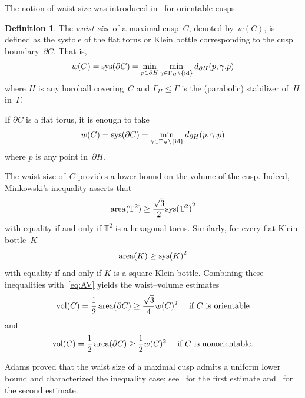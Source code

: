\documentclass[11pt,reqno]{amsart}
\theoremstyle{definition}
\newtheorem{definition}[theorem]{Definition}
\numberwithin{equation}{section}
\newcommand\T {{\mathbb T}}
\DeclareMathOperator{\area}{{\rm area}}
\DeclareMathOperator{\vol}{{\rm vol}}
\DeclareMathOperator{\sys}{{\rm sys}}
\DeclareMathOperator{\id}{id}
\numberwithin{equation}{section}
\begin{document}
\medskip

The notion of waist size was introduced in~\cite{adams_waist} for orientable cusps.

\begin{definition} \label{def:waist}
The \emph{waist size} of a maximal cusp~$C$, denoted by~$w(C)$, is defined as the systole of the flat torus or Klein bottle corresponding to the cusp boundary~$\partial C$.
That is,
\[
w(C) = \sys(\partial C) =  \min_{p \in \partial H} \min_{\gamma \in \Gamma_H \setminus \{ \id \}} d_{\partial H}(p,\gamma.p)
\]
where $H$ is any horoball covering~$C$ and $\Gamma_H \leqslant \Gamma$ is the (parabolic) stabilizer of~$H$ in~$\Gamma$.

If $\partial C$ is a flat torus, it is enough to take
\[
w(C) = \sys(\partial C) =  \min_{\gamma \in \Gamma_H \setminus \{ \id \}} d_{\partial H}(p,\gamma.p)
\]
where $p$ is any point in~$\partial H$.
\end{definition}

The waist size of~$C$ provides a lower bound on the volume of the cusp.
Indeed, Minkowski's inequality asserts that
\begin{equation} \label{eq:minkowski}
\area(\T^2) \geq \frac{\sqrt{3}}{2} {\sys(\T^2)}^2
\end{equation}
with equality if and only if $\T^2$ is a hexagonal torus.
Similarly, for every flat Klein bottle~$K$
\begin{equation} \label{eq:square}
\area(K) \geq {\sys(K)}^2
\end{equation}
with equality if and only if $K$ is a square Klein bottle.
Combining these inequalities with~\eqref{eq:AV} yields the waist--volume estimates
\begin{equation} \label{eq:waist-volume}
\vol(C) = \frac{1}{2} \area(\partial C) \geq \frac{\sqrt{3}}{4} w(C)^2 \quad \mbox{ if } C \mbox{ is orientable}
\end{equation}
and
\begin{equation} \label{eq:waist-volume2}
\vol(C) = \frac{1}{2} \area(\partial C) \geq \frac{1}{2} w(C)^2 \quad \mbox{ if } C \mbox{ is nonorientable}.
\end{equation}

Adams proved that the waist size of a maximal cusp admits a uniform lower bound and characterized the inequality case; see~\cite{adams_waist} for the first estimate and~\cite{adams_waist2} for the second estimate.
\end{document}

